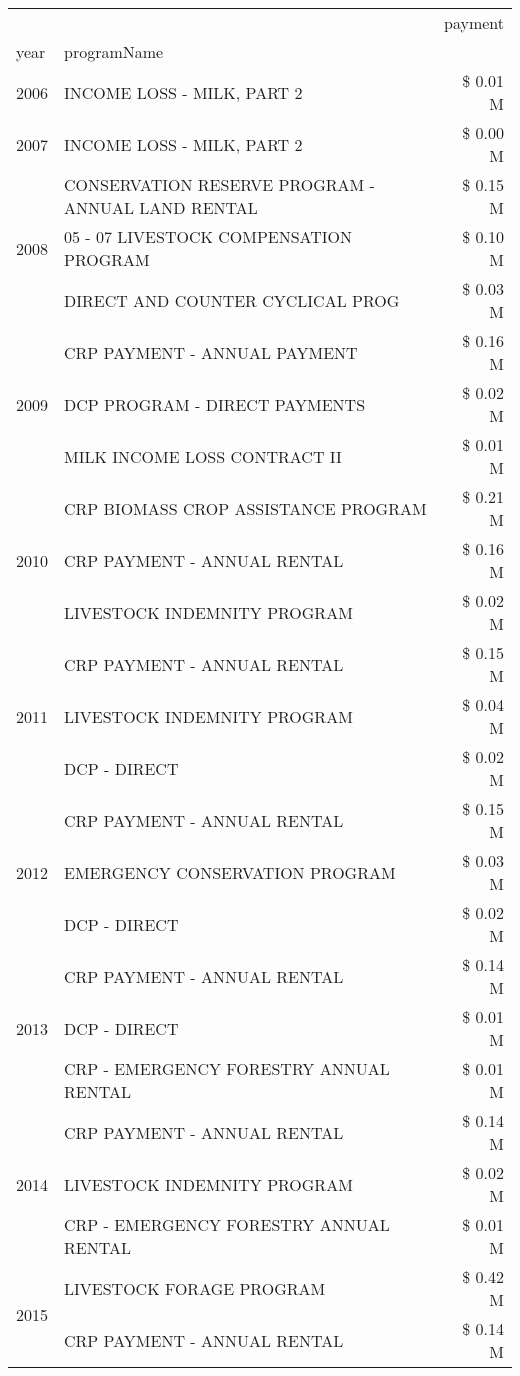 \begin{tabular}{llr}
\toprule
 &  & payment \\
year & programName &  \\
\midrule
2006 & INCOME LOSS - MILK, PART 2 & \$ 0.01 M \\
\cline{1-3}
2007 & INCOME LOSS - MILK, PART 2 & \$ 0.00 M \\
\cline{1-3}
\multirow[t]{3}{*}{2008} & CONSERVATION RESERVE PROGRAM - ANNUAL LAND RENTAL & \$ 0.15 M \\
 & 05 - 07 LIVESTOCK COMPENSATION PROGRAM & \$ 0.10 M \\
 & DIRECT AND COUNTER CYCLICAL PROG & \$ 0.03 M \\
\cline{1-3}
\multirow[t]{3}{*}{2009} & CRP PAYMENT - ANNUAL PAYMENT & \$ 0.16 M \\
 & DCP PROGRAM - DIRECT PAYMENTS & \$ 0.02 M \\
 & MILK INCOME LOSS CONTRACT II & \$ 0.01 M \\
\cline{1-3}
\multirow[t]{3}{*}{2010} & CRP BIOMASS CROP ASSISTANCE PROGRAM & \$ 0.21 M \\
 & CRP PAYMENT - ANNUAL RENTAL & \$ 0.16 M \\
 & LIVESTOCK INDEMNITY PROGRAM & \$ 0.02 M \\
\cline{1-3}
\multirow[t]{3}{*}{2011} & CRP PAYMENT - ANNUAL RENTAL & \$ 0.15 M \\
 & LIVESTOCK INDEMNITY PROGRAM & \$ 0.04 M \\
 & DCP - DIRECT & \$ 0.02 M \\
\cline{1-3}
\multirow[t]{3}{*}{2012} & CRP PAYMENT - ANNUAL RENTAL & \$ 0.15 M \\
 & EMERGENCY CONSERVATION PROGRAM & \$ 0.03 M \\
 & DCP - DIRECT & \$ 0.02 M \\
\cline{1-3}
\multirow[t]{3}{*}{2013} & CRP PAYMENT - ANNUAL RENTAL & \$ 0.14 M \\
 & DCP - DIRECT & \$ 0.01 M \\
 & CRP - EMERGENCY FORESTRY ANNUAL RENTAL & \$ 0.01 M \\
\cline{1-3}
\multirow[t]{3}{*}{2014} & CRP PAYMENT - ANNUAL RENTAL & \$ 0.14 M \\
 & LIVESTOCK INDEMNITY PROGRAM & \$ 0.02 M \\
 & CRP - EMERGENCY FORESTRY ANNUAL RENTAL & \$ 0.01 M \\
\cline{1-3}
\multirow[t]{3}{*}{2015} & LIVESTOCK FORAGE PROGRAM & \$ 0.42 M \\
 & CRP PAYMENT - ANNUAL RENTAL & \$ 0.14 M \\

\end{tabular}
